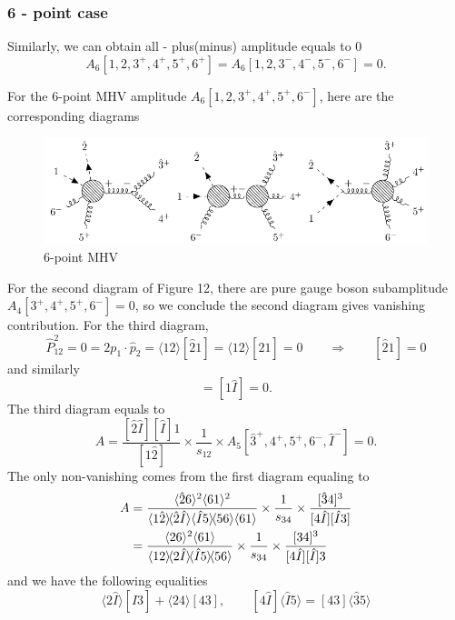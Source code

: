 \documentclass[12pt]{article}
\numberwithin{equation}{section}
\newcommand{\mdavg}[2]{\langle #1 \rangle\!\langle #2 \rangle}
\newcommand{\avg}[1]{\langle #1 \rangle}
\newcommand{\cbrak}[2]{\avg{#1}\![#2]}
\newcommand{\acbrak}[2]{[#1]\!\avg{#2}}
\begin{document}
\subsubsection{6 - point case}
Similarly, we can obtain all - plus(minus) amplitude equals to 0
\begin{equation}
    A_6[1,2,3^+,4^+,5^+,6^+]=A_6[1,2,3^-,4^-,5^-,6^-]=0.
\end{equation}

For the 6-point MHV amplitude $A_6[1,2,3^+,4^+,5^+,6^-]$, here are the corresponding diagrams
\begin{figure}[H]
    \centering
    \includegraphics[]{6pt1.pdf}
    \caption{6-point MHV}
\end{figure}
For the second diagram of Figure 12, there are pure gauge boson subamplitude $A_4[3^+,4^+,5^+,6^-]=0$, so we conclude the second diagram gives vanishing contribution. For the third diagram, 
\begin{equation}
    \hat{P}_{12}^2=0=2p_1\cdot\hat{p}_2=\cbrak{1\hat{2}}{\hat{2}1}=\cbrak{12}{\hat{2}1}=0 \qquad \Rightarrow \qquad [\hat{2}1]=0
\end{equation}
and similarly
\begin{equation}
    [\hat{2}\hat{I}]=[1\hat{I}]=0.
\end{equation}
The third diagram equals to
\begin{equation}
    A=\frac{[\hat{2}\hat{I}][\hat{I}]1}{[1\hat{2}]}\times\frac{1}{s_{12}}\times A_5[\hat{3}^+,4^+,5^+,6^-,\hat{I}^-]=0.
\end{equation}
The only non-vanishing comes from the first diagram equaling to
\begin{align}
    A&=\frac{\avg{\hat{2}6}^2\avg{61}^2}{\mdavg{1\hat{2}}{\hat{2}\hat{I}}\mdavg{\hat{I}5}{56}\avg{61}}\times\frac{1}{s_{34}}\times\frac{[\hat{3}4]^3}{[4\hat{I}][\hat{I}3]}\notag\\
    &=\frac{\avg{26}^2\avg{61}}{\mdavg{12}{2\hat{I}}\!\mdavg{\hat{I}5}{56}}\times\frac{1}{s_{34}}\times \frac{[34]^3}{[4\hat{I}][\hat{I}]3}
\end{align}
and we have the following equalities
\begin{equation}
    \cbrak{2\hat{I}}{\hat{I}3}+\cbrak{24}{43},\qquad \acbrak{4\hat{I}}{\hat{I}5}=\acbrak{43}{\hat{3}5}
\end{equation}
\end{document}
